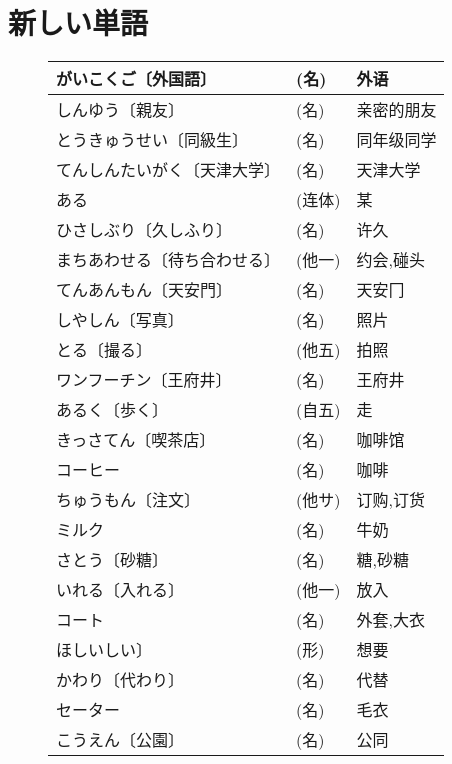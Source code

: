 
\usepackage{../../lectures_preamble}


    \section{新しい単語}
    \begin{figure}[htbp]
        \centering
        \begin{tabular}{l|l|l}
            がいこくご〔外国語〕 & (名) & 外语\\\hline
            しんゆう〔親友〕 & (名) & 亲密的朋友\\\hline
            とうきゅうせい〔同級生〕 &  (名) & 同年级同学\\\hline
            てんしんたいがく〔天津大学〕 & (名) & 天津大学\\\hline
            ある & (连体)  &某  \\\hline
            ひさしぶり〔久しふり〕& (名)   &许久   \\\hline
            まちあわせる〔待ち合わせる〕 &  (他一) &约会,碰头\\\hline
            てんあんもん〔天安門〕& (名)  &  天安冂   \\\hline
            しやしん〔写真〕 &(名) &   照片   \\\hline
            とる〔撮る〕  & (他五) & 拍照    \\\hline
            ワンフーチン〔王府井〕& (名) &  王府井  \\\hline
            あるく〔歩く〕& (自五) & 走\\\hline
            きっさてん〔喫茶店〕 &  (名)  &  咖啡馆 \\\hline
            コーヒー  & (名)  &  咖啡\\\hline
            ちゅうもん〔注文〕& (他サ)  & 订购,订货   \\\hline
            ミルク& (名)  &  牛奶\\\hline
            さとう〔砂糖〕& (名)  &  糖,砂糖 \\\hline
            いれる〔入れる〕 &  (他一) & 放入\\\hline
            コート   & (名) & 外套,大衣   \\\hline
            ほしいしい〕 &  (形)  &  想要    \\\hline
            かわり〔代わり〕 &  (名) &   代替    \\\hline
            セーター  & (名)  &  毛衣    \\\hline
            こうえん〔公園〕 &  (名) &   公同    \\\hline

\end{tabular}
\end{figure}
